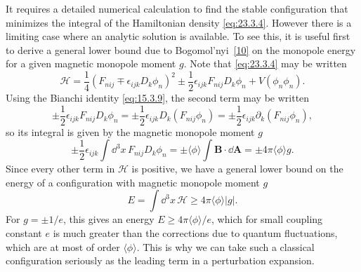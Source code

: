 It requires a detailed numerical calculation to find the stable
configuration that minimizes the integral of the Hamiltonian density
\eqref{eq:23.3.4}. However there is a limiting case where an analytic
solution is available. To see this, it is useful first to derive a general
lower bound due to Bogomol'nyi~\hyperref[ch23-ref-10]{[10]} on the
monopole energy for a given magnetic monopole moment $g$. Note that
\eqref{eq:23.3.4} may be written
\begin{equation}
 \mathcal H=\frac14(F_{nij}\mp\epsilon_{ijk}D_k\phi_n)^2
 \mathbin{\pm}\frac12\epsilon_{ijk}F_{nij}D_k\phi_n
 +V(\phi_n\phi_n).
 \tag{23.3.18}\label{eq:23.3.18}
\end{equation}
Using the Bianchi identity \eqref{eq:15.3.9}, the second term may be
written
\[
 \mathbin{\pm}\frac12\epsilon_{ijk}F_{nij}D_k\phi_n
 =\mathbin{\pm}\frac12\epsilon_{ijk}D_k(F_{nij}\phi_n)
 =\mathbin{\pm}\frac12\epsilon_{ijk}\partial_k(F_{nij}\phi_n),
\]
so its integral is given by the magnetic monopole moment $g$
\[
 \mathbin{\pm}\frac12\epsilon_{ijk}\int \dd^3x\,
 F_{nij}D_k\phi_n
 =\mathbin{\pm}\langle\phi\rangle\int\mathbf B\cdot \dd\mathbf A
 =\mathbin{\pm}4\pi\langle\phi\rangle g.
\]
Since every other term in $\mathcal H$ is positive, we have a general
lower bound on the energy of a configuration with magnetic monopole
moment $g$
\begin{equation}
 E=\int \dd^3x\,\mathcal H
 \geq4\pi\langle\phi\rangle|g|.
 \tag{23.3.19}\label{eq:23.3.19}
\end{equation}
For $g=\pm1/e$, this gives an energy
$E\geq4\pi\langle\phi\rangle/e$, which for small coupling constant $e$ is
much greater than the corrections due to quantum fluctuations, which are
at most of order $\langle\phi\rangle$. This is why we can take such a
classical configuration seriously as the leading term in a perturbation
expansion.


